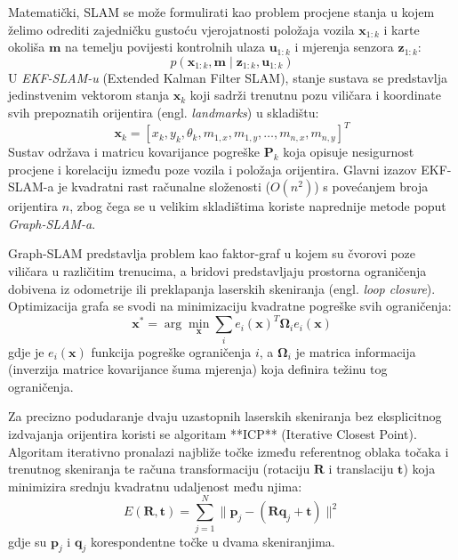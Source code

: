 \documentclass[12pt,a4paper]{article}
\begin{document}
Matematički, SLAM se može formulirati kao problem procjene stanja u kojem želimo odrediti zajedničku gustoću vjerojatnosti položaja vozila $\mathbf{x}_{1:k}$ i karte okoliša $\mathbf{m}$ na temelju povijesti kontrolnih ulaza $\mathbf{u}_{1:k}$ i mjerenja senzora $\mathbf{z}_{1:k}$:
\begin{equation}
    p(\mathbf{x}_{1:k}, \mathbf{m} \mid \mathbf{z}_{1:k}, \mathbf{u}_{1:k})
\end{equation}
U \textit{EKF-SLAM-u} (Extended Kalman Filter SLAM), stanje sustava se predstavlja jedinstvenim vektorom stanja $\mathbf{x}_k$ koji sadrži trenutnu pozu viličara i koordinate svih prepoznatih orijentira (engl. \textit{landmarks}) u skladištu:
\begin{equation}
    \mathbf{x}_k = [x_k, y_k, \theta_k, m_{1,x}, m_{1,y}, \dots, m_{n,x}, m_{n,y}]^T
\end{equation}
Sustav održava i matricu kovarijance pogreške $\mathbf{P}_k$ koja opisuje nesigurnost procjene i korelaciju između poze vozila i položaja orijentira. Glavni izazov EKF-SLAM-a je kvadratni rast računalne složenosti ($O(n^2)$) s povećanjem broja orijentira $n$, zbog čega se u velikim skladištima koriste naprednije metode poput \textit{Graph-SLAM-a}.

Graph-SLAM predstavlja problem kao faktor-graf u kojem su čvorovi poze viličara u različitim trenucima, a bridovi predstavljaju prostorna ograničenja dobivena iz odometrije ili preklapanja laserskih skeniranja (engl. \textit{loop closure}). Optimizacija grafa se svodi na minimizaciju kvadratne pogreške svih ograničenja:
\begin{equation}
    \mathbf{x}^* = \arg\min_{\mathbf{x}} \sum_{i} e_i(\mathbf{x})^T \mathbf{\Omega}_i e_i(\mathbf{x})
\end{equation}
gdje je $e_i(\mathbf{x})$ funkcija pogreške ograničenja $i$, a $\mathbf{\Omega}_i$ je matrica informacija (inverzija matrice kovarijance šuma mjerenja) koja definira težinu tog ograničenja.

Za precizno podudaranje dvaju uzastopnih laserskih skeniranja bez eksplicitnog izdvajanja orijentira koristi se algoritam **ICP** (Iterative Closest Point). Algoritam iterativno pronalazi najbliže točke između referentnog oblaka točaka i trenutnog skeniranja te računa transformaciju (rotaciju $\mathbf{R}$ i translaciju $\mathbf{t}$) koja minimizira srednju kvadratnu udaljenost među njima:
\begin{equation}
    E(\mathbf{R}, \mathbf{t}) = \sum_{j=1}^{N} \| \mathbf{p}_j - (\mathbf{R} \mathbf{q}_j + \mathbf{t}) \|^2
\end{equation}
gdje su $\mathbf{p}_j$ i $\mathbf{q}_j$ korespondentne točke u dvama skeniranjima.
\end{document}
